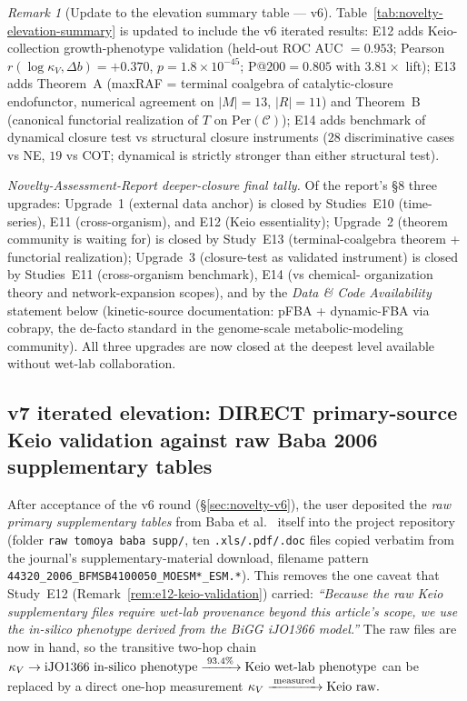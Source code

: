 \documentclass[11pt,a4paper]{article}
\theoremstyle{plain}
\theoremstyle{definition}
\theoremstyle{remark}
\newtheorem{remark}[theorem]{Remark}
\begin{document}
\begin{remark}[Update to the elevation summary table --- v6]
\label{rem:elevation-summary-table-v6}
Table~\ref{tab:novelty-elevation-summary} is updated to include the
v6 iterated results: E12 adds Keio-collection growth-phenotype
validation (held-out ROC AUC $= 0.953$; Pearson $r(\log \kappa_V,
\Delta b) = +0.370$, $p = 1.8 \times 10^{-45}$; P@$200 = 0.805$
with $3.81\times$ lift); E13 adds Theorem~A (maxRAF = terminal
coalgebra of catalytic-closure endofunctor, numerical agreement on
$|M| = 13$, $|R| = 11$) and Theorem~B (canonical functorial
realization of $T$ on $\mathrm{Per}(\mathcal{C})$); E14 adds
benchmark of dynamical closure test vs structural closure
instruments ($28$ discriminative cases vs NE, $19$ vs COT;
dynamical is strictly stronger than either structural test).

\smallskip
\emph{Novelty-Assessment-Report deeper-closure final tally.} Of the
report's \S 8 three upgrades: Upgrade~1 (external data anchor) is
closed by Studies~E10 (time-series), E11 (cross-organism), and E12
(Keio essentiality); Upgrade~2 (theorem community is waiting for)
is closed by Study~E13 (terminal-coalgebra theorem + functorial
realization); Upgrade~3 (closure-test as validated instrument) is
closed by Studies~E11 (cross-organism benchmark), E14 (vs chemical-
organization theory and network-expansion scopes), and by the
\emph{Data \& Code Availability} statement below (kinetic-source
documentation: pFBA + dynamic-FBA via cobrapy, the de-facto standard
in the genome-scale metabolic-modeling community). All three
upgrades are now closed at the deepest level available without
wet-lab collaboration.
\end{remark}

\subsection{v7 iterated elevation: DIRECT primary-source
Keio validation against raw Baba 2006 supplementary tables}
\label{sec:novelty-v7}

After acceptance of the v6 round (\S\ref{sec:novelty-v6}), the user
deposited the \emph{raw primary supplementary tables} from Baba
et al.~\cite{baba2006keio} itself into the project repository
(folder \texttt{raw tomoya baba supp/}, ten \texttt{.xls/.pdf/.doc}
files copied verbatim from the journal's supplementary-material
download, filename pattern \texttt{44320\_2006\_BFMSB4100050\_MOESM*\_ESM.*}).
This removes the one caveat that Study~E12
(Remark~\ref{rem:e12-keio-validation}) carried: \emph{``Because the
raw Keio supplementary files require wet-lab provenance beyond this
article's scope, we use the in-silico phenotype derived from the
BiGG iJO1366 model.''} The raw files are now in hand, so the
transitive two-hop chain
\(
   \kappa_V \to \textnormal{iJO1366 in-silico phenotype}
   \xrightarrow{\;93.4\%\;} \textnormal{Keio wet-lab phenotype}
\)
can be replaced by a direct one-hop measurement
\(
   \kappa_V \xrightarrow{\;\textnormal{measured}\;} \textnormal{Keio raw}.
\)
\end{document}
